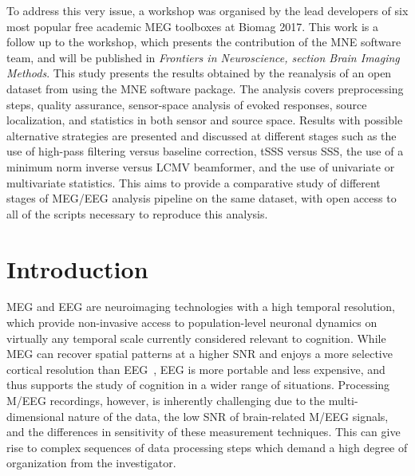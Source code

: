 To address this very issue, a workshop was organised by the lead developers of six most popular free academic MEG toolboxes at Biomag 2017. This work is a follow up to the workshop, which presents the contribution of the MNE software team, and will be published in \emph{Frontiers in Neuroscience, section Brain Imaging Methods}. This study presents the results obtained by the reanalysis of an open dataset from \citet{wakeman2015multi} using the MNE software package. The analysis covers preprocessing steps, quality assurance, sensor-space analysis of evoked responses, source localization, and statistics in both sensor and source space. Results with possible alternative strategies are presented and discussed at different stages such as the use of high-pass filtering versus baseline correction, tSSS versus \ac{SSS}, the use of a minimum norm inverse versus \ac{LCMV} beamformer, and the use of univariate or multivariate statistics. This aims to provide a comparative study of different stages of \ac{MEG}/\ac{EEG} analysis pipeline on the same dataset, with open access to all of the scripts necessary to reproduce this analysis.

\noindent{}%

\clearpage
\section{Introduction}
\label{sec:group_study_intro}

\Ac{MEG} and \ac{EEG} are neuroimaging technologies with a high temporal resolution, which provide non-invasive access to population-level neuronal dynamics on virtually any temporal scale currently considered relevant to cognition. %
While MEG can recover spatial patterns at a higher \ac{SNR} and enjoys a more selective cortical resolution than \ac{EEG}~\citep{baillet17}, EEG is more portable and less expensive, and thus supports the study of cognition in a wider range of situations. Processing M/EEG recordings, however, is inherently challenging due to the multi-dimensional nature of the data, the low \ac{SNR} of brain-related M/EEG signals, and the differences in sensitivity of these measurement techniques. This can give rise to complex sequences of data processing steps which demand a high degree of organization from the investigator.


